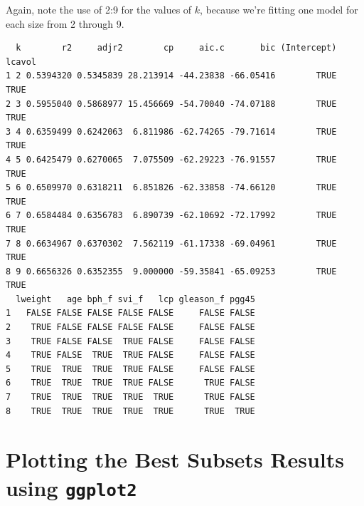 \documentclass[]{book}
\newenvironment{Shaded}{\begin{snugshade}}{\end{snugshade}}
\newcommand{\KeywordTok}[1]{\textcolor[rgb]{0.13,0.29,0.53}{\textbf{#1}}}
\newcommand{\DataTypeTok}[1]{\textcolor[rgb]{0.13,0.29,0.53}{#1}}
\newcommand{\DecValTok}[1]{\textcolor[rgb]{0.00,0.00,0.81}{#1}}
\newcommand{\StringTok}[1]{\textcolor[rgb]{0.31,0.60,0.02}{#1}}
\newcommand{\OperatorTok}[1]{\textcolor[rgb]{0.81,0.36,0.00}{\textbf{#1}}}
\newcommand{\NormalTok}[1]{#1}
\theoremstyle{definition}
\theoremstyle{definition}
\theoremstyle{definition}
\theoremstyle{remark}
\begin{document}
Again, note the use of 2:9 for the values of \(k\), because we're
fitting one model for each size from 2 through 9.

\begin{Shaded}
\end{Shaded}

\begin{verbatim}
  k        r2     adjr2        cp     aic.c       bic (Intercept) lcavol
1 2 0.5394320 0.5345839 28.213914 -44.23838 -66.05416        TRUE   TRUE
2 3 0.5955040 0.5868977 15.456669 -54.70040 -74.07188        TRUE   TRUE
3 4 0.6359499 0.6242063  6.811986 -62.74265 -79.71614        TRUE   TRUE
4 5 0.6425479 0.6270065  7.075509 -62.29223 -76.91557        TRUE   TRUE
5 6 0.6509970 0.6318211  6.851826 -62.33858 -74.66120        TRUE   TRUE
6 7 0.6584484 0.6356783  6.890739 -62.10692 -72.17992        TRUE   TRUE
7 8 0.6634967 0.6370302  7.562119 -61.17338 -69.04961        TRUE   TRUE
8 9 0.6656326 0.6352355  9.000000 -59.35841 -65.09253        TRUE   TRUE
  lweight   age bph_f svi_f   lcp gleason_f pgg45
1   FALSE FALSE FALSE FALSE FALSE     FALSE FALSE
2    TRUE FALSE FALSE FALSE FALSE     FALSE FALSE
3    TRUE FALSE FALSE  TRUE FALSE     FALSE FALSE
4    TRUE FALSE  TRUE  TRUE FALSE     FALSE FALSE
5    TRUE  TRUE  TRUE  TRUE FALSE     FALSE FALSE
6    TRUE  TRUE  TRUE  TRUE FALSE      TRUE FALSE
7    TRUE  TRUE  TRUE  TRUE  TRUE      TRUE FALSE
8    TRUE  TRUE  TRUE  TRUE  TRUE      TRUE  TRUE
\end{verbatim}

\section{\texorpdfstring{Plotting the Best Subsets Results using
\texttt{ggplot2}}{Plotting the Best Subsets Results using ggplot2}}\label{plotting-the-best-subsets-results-using-ggplot2}
\end{document}
